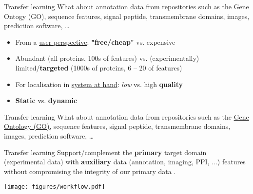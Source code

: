 \begin{frame}{Transfer learning}
  What about annotation data from repositories such as the Gene Ontogy
  (GO), sequence features, signal peptide, transmembrane domains,
  images, prediction software, \ldots

  \begin{block}{}
    \begin{itemize}
    \item From a \underline{user perspective}: \textbf{"free/cheap"}
      vs. expensive
    \item Abundant (all proteins, 100s of features) vs. (experimentally)
      limited/\textbf{targeted} (1000s of proteins, 6 -- 20 of features)
    \item For localisation in \underline{system at hand}: \textit{low}
      vs. high \textbf{quality}
    \item \textbf{Static} vs. \textbf{dynamic}
    \end{itemize}
  \end{block}

\end{frame}

\begin{frame}{Transfer learning}
  What about annotation data from repositories such as the
  \underline{Gene Ontology (GO)}, sequence features, signal peptide,
  transmembrane domains, images, prediction software, \ldots

  \begin{block}{Transfer learning}
    Support/complement the \textbf{primary} target domain
    (experimental data) with \textbf{auxiliary} data (annotation,
    imaging, PPI, ...)  features without compromising the integrity of
    our primary data \citep{Breckels:2016}.
  \end{block}

\end{frame}


\begin{frame}
  \begin{center}
    \texttt{[image: figures/workflow.pdf]}      
  \end{center}
\end{frame}

